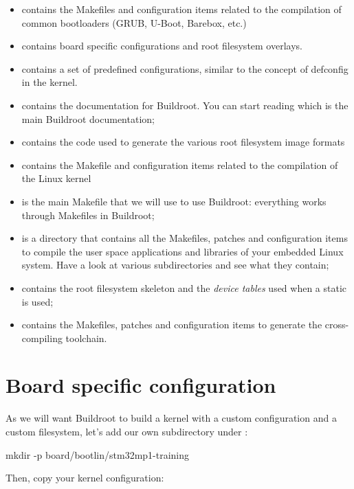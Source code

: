 \begin{itemize}
\item {} contains the Makefiles and configuration items
  related to the compilation of common bootloaders (GRUB, U-Boot,
  Barebox, etc.)
\item {} contains board specific configurations and
  root filesystem overlays.
\item {} contains a set of predefined configurations,
  similar to the concept of defconfig in the kernel.
\item {} contains the documentation for Buildroot. You can
  start reading  which is the main Buildroot
  documentation;
\item {} contains the code used to generate the various root
  filesystem image formats
\item {} contains the Makefile and configuration items
  related to the compilation of the Linux kernel
\item {} is the main Makefile that we will use to use
  Buildroot: everything works through Makefiles in Buildroot;
\item {} is a directory that contains all the Makefiles,
  patches and configuration items to compile the user space
  applications and libraries of your embedded Linux system. Have a
  look at various subdirectories and see what they contain;
\item {} contains the root filesystem skeleton and the {\em
    device tables} used when a static  is used;
\item {} contains the Makefiles, patches and
  configuration items to generate the cross-compiling toolchain.
\end{itemize}

\section{Board specific configuration}

As we will want Buildroot to build a kernel with a custom configuration
and a custom filesystem, let's add our own subdirectory under
:

\begin{bashinput}
mkdir -p board/bootlin/stm32mp1-training
\end{bashinput}

Then, copy your kernel configuration:

